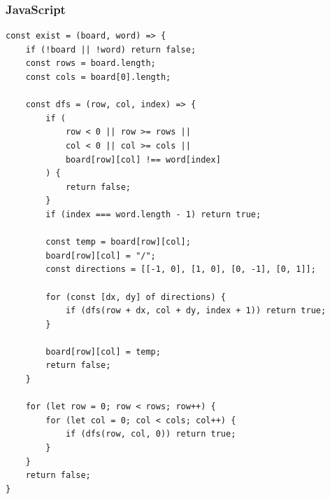 \documentclass[11pt]{article}
\begin{document}
\subsubsection{JavaScript}
\begin{verbatim}
const exist = (board, word) => {
    if (!board || !word) return false;  
    const rows = board.length;
    const cols = board[0].length;
 
    const dfs = (row, col, index) => {
        if (
            row < 0 || row >= rows ||
            col < 0 || col >= cols ||
            board[row][col] !== word[index]
        ) {
            return false;
        }  
        if (index === word.length - 1) return true;
 
        const temp = board[row][col];
        board[row][col] = "/";
        const directions = [[-1, 0], [1, 0], [0, -1], [0, 1]];
 
        for (const [dx, dy] of directions) {
            if (dfs(row + dx, col + dy, index + 1)) return true;
        }
 
        board[row][col] = temp;
        return false;
    }
 
    for (let row = 0; row < rows; row++) {
        for (let col = 0; col < cols; col++) {
            if (dfs(row, col, 0)) return true;
        }
    }
    return false;
}

\end{verbatim}
\end{document}
